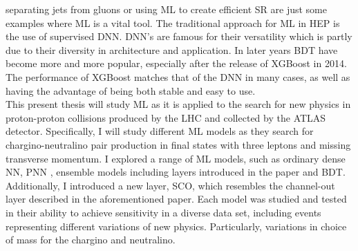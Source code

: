 separating jets from gluons \cite{PhysRevD.44.2025} or using \ac{ML} to create efficient \ac{SR} \cite{baldi_searching_2014} are just some examples
where \ac{ML} is a vital tool. The traditional approach for \ac{ML} in \ac{HEP} is the use of supervised
\ac{DNN}. \ac{DNN}'s are famous for their versatility which is partly due to their diversity in architecture and 
application. In later years \ac{BDT} have become more and more popular, especially after the release of XGBoost \cite{XGB}
in 2014. The performance of XGBoost matches that of the \ac{DNN} in many cases, as well as having the advantage 
of being both stable and easy to use. \newline
\\
This present thesis will study \ac{ML} as it is applied to the search for new physics in proton-proton collisions produced by the \ac{LHC} and collected by 
the \acs{ATLAS} detector. Specifically, I will study different \ac{ML} models as they search for chargino-neutralino pair production in final states 
with three leptons and missing transverse momentum. I explored a range of \ac{ML} models, such as ordinary dense \acl{NN}, \acl{PNN} \cite{PNN},
ensemble models including layers introduced in the paper \cite{wang_maxout_2013} and \acl{BDT}. Additionally, I introduced a new layer, \acl{SCO}, which 
resembles the channel-out layer described in the aforementioned paper. Each model was studied and tested in their ability to achieve sensitivity in a diverse 
data set, including events representing different variations of new physics. Particularly, variations in choice of mass for the chargino and neutralino.
